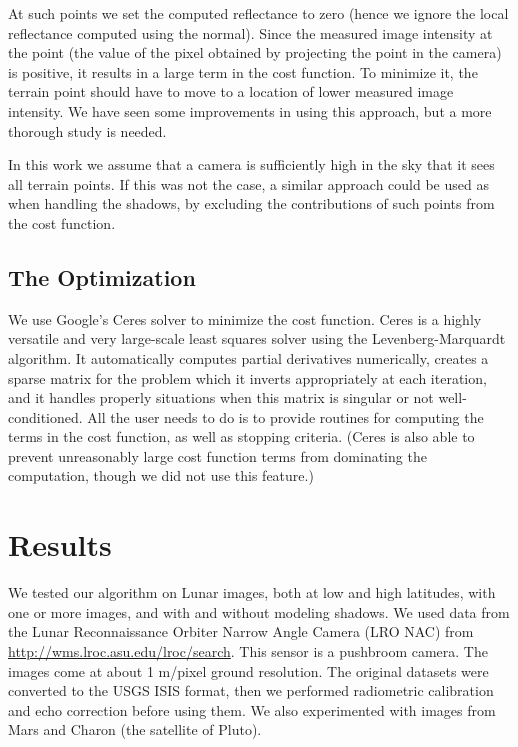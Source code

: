 \documentclass[12pt,oneside]{article}
\begin{document}
At such points we set the computed reflectance to zero (hence we ignore
the local reflectance computed using the normal). Since the measured
image intensity at the point (the value of the pixel obtained by
projecting the point in the camera) is positive, it results in a large
term in the cost function. To minimize it, the terrain point should have
to move to a location of lower measured image intensity. We have seen
some improvements in using this approach, but a more thorough study is
needed.

In this work we assume that a camera is sufficiently high in the sky
that it sees all terrain points. If this was not the case, a similar
approach could be used as when handling the shadows, by excluding the
contributions of such points from the cost function.

\subsection{The Optimization}

We use Google's Ceres solver \citet{agarwal2012ceres} to minimize the
cost function. Ceres is a highly versatile and very large-scale least
squares solver using the Levenberg-Marquardt algorithm. It automatically
computes partial derivatives numerically, creates a sparse matrix for
the problem which it inverts appropriately at each iteration, and it
handles properly situations when this matrix is singular or not
well-conditioned. All the user needs to do is to provide routines for computing
the terms in the cost function, as well as stopping
criteria. (Ceres is also able to prevent unreasonably large cost function
terms from dominating the computation, though we did not use this feature.)

\section{Results}

We tested our algorithm on Lunar images, both at low and high
latitudes, with one or more images, and with and without modeling
shadows.  We used data from the Lunar Reconnaissance Orbiter Narrow
Angle Camera (LRO NAC) from
\url{http://wms.lroc.asu.edu/lroc/search}. This sensor is a pushbroom
camera. The images come at about 1 m/pixel ground resolution. The
original datasets were converted to the USGS ISIS format, then we
performed radiometric calibration and echo correction before using them.
We also experimented with images from Mars and Charon (the satellite of Pluto).
\end{document}
